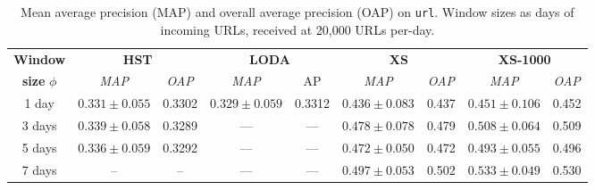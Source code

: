 \documentclass[11pt,onecolumn]{article}
\begin{document}
\begin{table}[!hbtp]
    \centering
    \begin{tabular}{ccccccccc}
    \toprule
    \textbf{Window} & \multicolumn{2}{c}{\textbf{HST}} & \multicolumn{2}{c}{\textbf{LODA}} & \multicolumn{2}{c}{\textbf{XS}} & \multicolumn{2}{c}{\textbf{XS-1000}} \\
    \textbf{size} $\phi$ & \textit{MAP} & \textit{OAP} & \textit{MAP}& AP     & \textit{MAP} & \textit{OAP} & \textit{MAP} & \textit{OAP}	\\
    \midrule
    1 day  & $0.331 \pm 0.055$  & 0.3302  & $0.329 \pm 0.059$ & 0.3312 & $0.436 \pm 0.083$ & 0.437 & $0.451 \pm 0.106$ & 0.452 \\
    3 days & $0.339 \pm 0.058$  & 0.3289  & ---         & ---          & $0.478 \pm 0.078$ & 0.479 & $0.508 \pm 0.064$ & 0.509\\
    5 days & $0.336 \pm 0.059$  & 0.3292  & ---         & ---          & $0.472 \pm 0.050$ & 0.472 & $0.493 \pm 0.055$ & 0.496 \\
    7 days & --                  & --      & ---        & ---          & $0.497 \pm 0.053$ & 0.502 & $0.533 \pm 0.049$ & 0.530 \\
    \bottomrule
    \end{tabular}
    \caption{Mean average precision (MAP) and overall average precision (OAP) on \texttt{url}. Window sizes as days of incoming URLs, received at 20,000 URLs per-day.}
\end{table}

\printbibliography
\end{document}
